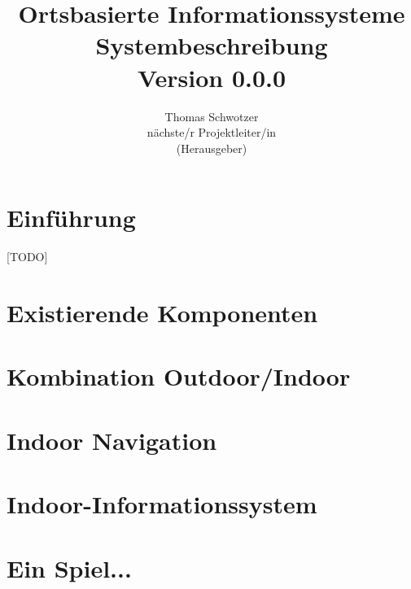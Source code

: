 \documentclass[german]{book}
\begin{document}
\title{Ortsbasierte Informationssysteme\\
Systembeschreibung \\
Version 0.0.0
}

\author{Thomas Schwotzer \\
nächste/r Projektleiter/in\\
(Herausgeber)
}

\maketitle

\tableofcontents

\chapter{Einführung}
[TODO]

\chapter{Existierende Komponenten}

\chapter{Kombination Outdoor/Indoor}


\chapter{Indoor Navigation}
%

\chapter{Indoor-Informationssystem}
%

\chapter{Ein Spiel...}
%



\end{document}
